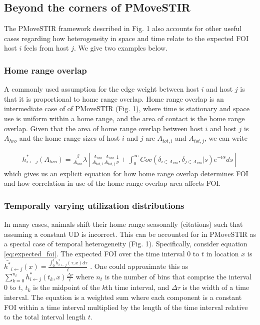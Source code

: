 \documentclass[letterpaper]{article}
\begin{document}
\subsection*{Beyond the corners of PMoveSTIR}

The PMoveSTIR framework described in Fig. 1 also accounts for other useful cases regarding how heterogeneity in space and time relate to the expected FOI host $i$ feels from host $j$.  We give two examples below.

\subsubsection*{Home range overlap}

A commonly used assumption for the edge weight between host $i$ and host $j$ is that it is proportional to home range overlap.  Home range overlap is an intermediate case of of PMoveSTIR (Fig. 1), where time is stationary and space use is uniform within a home range, and the area of contact is the home range overlap.  Given that the area of home range overlap between host $i$ and host $j$ is $A_{hro}$ and the home range sizes of host $i$ and $j$ are $A_{tot, i}$ and $A_{tot, j}$, we can write

\begin{equation}
    \begin{aligned}
    h^*_{i \leftarrow j}(A_{hro}) = \frac{\tilde{\beta}}{A_{hro}} \lambda \left[\frac{A_{hro}}{A_{tot, i}} \frac{A_{hro}}{A_{tot, j}}  \frac{1}{\nu} + \int_{0}^{\infty} Cov(\delta_{i \in A_{hro}}, \delta_{j \in A_{hro}} | s) e^{-\nu s} ds\right]
    \end{aligned}
    \label{eq:home_range}
\end{equation}
which gives us an explicit equation for how home range overlap determines FOI and how correlation in use of the home range overlap area affects FOI. 

\subsubsection*{Temporally varying utilization distributions}

In many cases, animals shift their home range seasonally (citations) such that assuming a constant UD is incorrect. This can be accounted for in PMoveSTIR as a special case of temporal heterogeneity (Fig. 1).  Specifically, consider equation \ref{eq:expected_foi}. The expected FOI over the time interval 0 to $t$ in location $x$ is $\bar{h^*}_{i \leftarrow j}(x) = \frac{\int_0^t h^*_{i \leftarrow j}(\tau, x) d\tau}{t}$ \citep{Wilber2022}.  One could approximate this as $\sum_{k = 0}^{n_t} h^*_{i \leftarrow j}(t_k, x) \frac{\Delta \tau}{t}$ where $n_t$ is the number of bins that comprise the interval 0 to $t$, $t_k$ is the midpoint of the $k$th time interval, and $\Delta \tau$ is the width of a time interval.  The equation is a weighted sum where each component is a constant FOI within a time interval multiplied by the length of the time interval relative to the total interval length $t$.  
\end{document}
